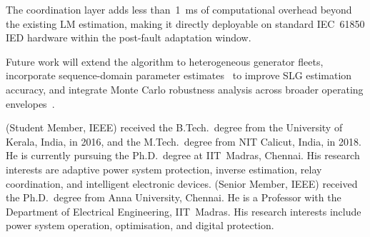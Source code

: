 \documentclass[journal,twoside,letterpaper]{IEEEtran}
\begin{document}
The coordination layer adds less than~1~ms of
computational overhead beyond the existing LM
estimation, making it directly deployable on standard
IEC~61850 IED hardware within the post-fault adaptation
window.

Future work will extend the algorithm to heterogeneous
generator fleets, incorporate sequence-domain parameter
estimates~\cite{Eluvathingal2026_TR03} to improve
SLG estimation accuracy, and integrate Monte Carlo
robustness analysis across broader operating
envelopes~\cite{Eluvathingal2026_TR08}.




\vfill

(Student Member, IEEE) received the B.Tech.\ degree from the University of
Kerala, India, in 2016, and the M.Tech.\ degree from NIT Calicut, India,
in 2018.  He is currently pursuing the Ph.D.\ degree at IIT~Madras,
Chennai.  His research interests are adaptive power system protection,
inverse estimation, relay coordination, and intelligent electronic devices.
\bigskip
{}
(Senior Member, IEEE) received the Ph.D.\ degree from Anna University,
Chennai.  He is a Professor with the Department of Electrical Engineering,
IIT~Madras.  His research interests include power system operation,
optimisation, and digital protection.
\end{document}
